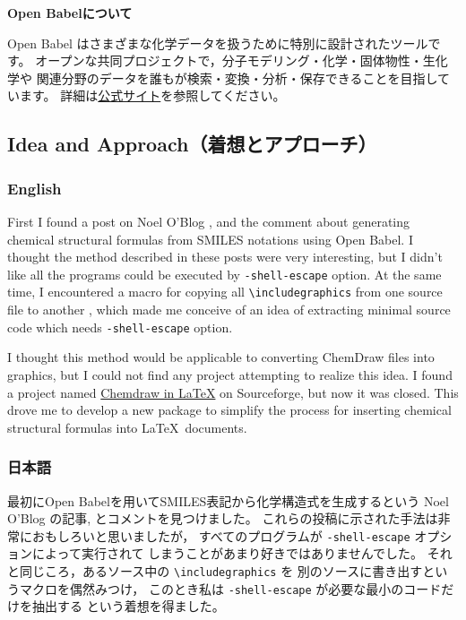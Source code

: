 \documentclass[12pt]{ltjsarticle}
\begin{document}
\noindent \textbf{Open Babelについて}

Open Babel はさまざまな化学データを扱うために特別に設計されたツールです。
オープンな共同プロジェクトで，分子モデリング・化学・固体物性・生化学や
関連分野のデータを誰もが検索・変換・分析・保存できることを目指しています。
詳細は\href{http://openbabel.org/}{公式サイト}を参照してください。

\clearpage

\subsection{Idea and Approach（着想とアプローチ）}

\subsubsection{English}
First I found a post on Noel O'Blog \cite{NOB1}, \cite{NOB2} and
the comment \cite{JLA} about generating chemical structural formulas
from SMILES notations using Open Babel.
I thought the method described in these posts were very interesting,
but I didn't like all the programs could be executed by
\verb|-shell-escape| option.
At the same time, I encountered a macro for copying all
\verb|\includegraphics| from one source file to another \cite{OKU},
which made me conceive of an idea of extracting minimal source code
which needs \verb|-shell-escape| option.

I thought this method would be applicable to converting ChemDraw files into
graphics, but I could not find any project attempting to realize this idea.
I found a project named
\href{http://chemdrawinlatex.sourceforge.net/}{Chemdraw in \LaTeX}
on Sourceforge, but now it was closed.
This drove me to develop a new package to simplify the process for
inserting chemical structural formulas into \LaTeX\ documents.

\subsubsection{日本語}

最初にOpen Babelを用いてSMILES表記から化学構造式を生成するという
Noel O'Blog の記事\cite{NOB1}, \cite{NOB2}とコメント\cite{JLA}を見つけました。
これらの投稿に示された手法は非常におもしろいと思いましたが，
すべてのプログラムが \verb|-shell-escape| オプションによって実行されて
しまうことがあまり好きではありませんでした。
それと同じころ，あるソース中の \verb|\includegraphics| を
別のソースに書き出すというマクロ\cite{OKU}を偶然みつけ，
このとき私は \verb|-shell-escape| が必要な最小のコードだけを抽出する
という着想を得ました。
\end{document}
